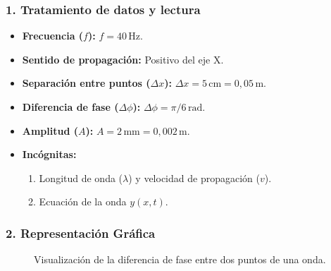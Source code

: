 \subsubsection*{1. Tratamiento de datos y lectura}
\begin{itemize}
    \item \textbf{Frecuencia ($f$):} $f=40\,\text{Hz}$.
    \item \textbf{Sentido de propagación:} Positivo del eje X.
    \item \textbf{Separación entre puntos ($\Delta x$):} $\Delta x = 5\,\text{cm} = 0,05\,\text{m}$.
    \item \textbf{Diferencia de fase ($\Delta\phi$):} $\Delta\phi = \pi/6\,\text{rad}$.
    \item \textbf{Amplitud ($A$):} $A = 2\,\text{mm} = 0,002\,\text{m}$.
    \item \textbf{Incógnitas:}
    \begin{enumerate}
        \item Longitud de onda ($\lambda$) y velocidad de propagación ($v$).
        \item Ecuación de la onda $y(x,t)$.
    \end{enumerate}
\end{itemize}

\subsubsection*{2. Representación Gráfica}
\begin{figure}[H]
    \centering
    \caption{Visualización de la diferencia de fase entre dos puntos de una onda.}
\end{figure}

